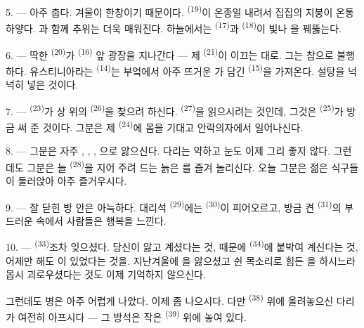 5. --- 아주 춥다. 겨울이 한창이기 때문이다.  \textsuperscript{(19)}이 온종일
내려서 집집의 지붕이 온통 하얗다. 과 함께 추위는 더욱 매워진다. 하늘에서는
 \textsuperscript{(17)}과  \textsuperscript{(18)}이 빛나
을 꿰뚫는다.

\VUsaut{4.2mm}
\VUsaut{3.0mm}

6. --- 딱한  \textsuperscript{(20)}가 
\textsuperscript{(16)} 앞 광장을 지나간다 — 제  \textsuperscript{(21)}이
이끄는 대로. 그는 참으로 불행하다. 유스티니아라는  \textsuperscript{(14)}는 부엌에서
아주 뜨거운 가 담긴  \textsuperscript{(15)}을 가져온다. 설탕을
넉넉히 넣은 것이다.

7. ---  \textsuperscript{(23)}가 상 위의 
\textsuperscript{(26)}을 찾으려 하신다.  \textsuperscript{(27)}을 읽으시려는
것인데, 그것은  \textsuperscript{(25)}가 방금 써 준 것이다. 그분은 제
 \textsuperscript{(24)}에 몸을 기대고 안락의자에서 일어나신다.

8. --- 그분은 자주 , , , 으로
앓으신다. 다리는 약하고 눈도 이제 그리 좋지 않다. 그런데도 그분은 늘 
\textsuperscript{(28)}을 지어 주려 드는 늙은 를 즐겨 놀리신다. 오늘 그분은
젊은 식구들이 둘러앉아 아주 즐거우시다.

9. --- 잘 닫힌 방 안은 아늑하다. 대리석  \textsuperscript{(29)}에는
 \textsuperscript{(30)}이 피어오르고, 방금 켠 
\textsuperscript{(31)}의 부드러운  속에서 사람들은 행복을 느낀다.

\VUsaut{4.2mm}
\VUsaut{3.0mm}

10. ---  \textsuperscript{(33)}조차 잊으셨다. 당신이 앓고 계셨다는 것,
 때문에  \textsuperscript{(34)}에 붙박여 계신다는 것,
어제만 해도 이 있었다는 것을. 지난겨울에 을 앓으셨고
쉰 목소리로 힘든 을 하시느라 몹시 괴로우셨다는 것도 이제 기억하지 않으신다.

그런데도 병은 아주 어렵게 나았다. 이제 좀 나으시다. 다만 
\textsuperscript{(38)} 위에 올려놓으신 다리가 여전히 아프시다 — 그 방석은 작은
 \textsuperscript{(39)} 위에 놓여 있다.

